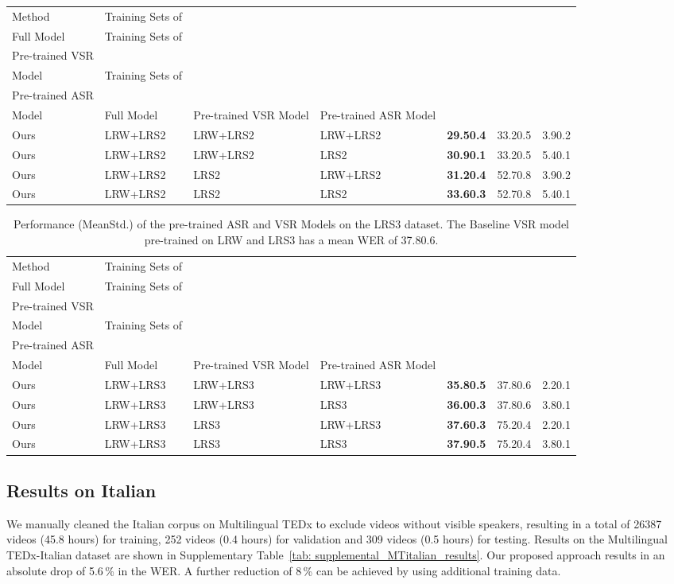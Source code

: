\documentclass[twocolumn]{article}
\begin{document}
\begin{table*}[!t]
\renewcommand\arraystretch{1.2}
\begin{tabularx}{2\columnwidth}{f j j j y y y }
\toprule
Method &Training Sets of \\Full Model &Training Sets of \\Pre-trained VSR\\ Model &Training Sets of \\ Pre-trained ASR \\Model & Full Model  &Pre-trained VSR Model &Pre-trained ASR Model \\
\midrule
Ours &LRW+LRS2 &LRW+LRS2 &LRW+LRS2  &\bf 29.50.4 &33.20.5 &3.90.2
\\ \midrule
Ours &LRW+LRS2 &LRW+LRS2 &LRS2 &\bf 30.90.1 &33.20.5 &5.40.1
\\ \midrule
Ours &LRW+LRS2 &LRS2 &LRW+LRS2 &\bf 31.20.4 &52.70.8
&3.90.2
\\ \midrule
Ours &LRW+LRS2 &LRS2 &LRS2 &\bf 33.60.3 &52.70.8
&5.40.1
\\ 
\bottomrule
\end{tabularx}
\label{table: r2_results_on_LRS2}
\end{table*}
 \begin{table*}[!t]
\caption{Performance (MeanStd.) of the pre-trained ASR and VSR Models on the LRS3 dataset. The Baseline VSR model pre-trained on LRW and LRS3 has a mean WER of 37.80.6.}
\renewcommand\arraystretch{1.2}
\begin{tabularx}{2\columnwidth}{f j j j y y y }
\toprule
Method &Training Sets of \\Full Model &Training Sets of \\Pre-trained VSR\\ Model &Training Sets of \\ Pre-trained ASR \\Model & Full Model  &Pre-trained VSR Model &Pre-trained ASR Model \\
\midrule
Ours &LRW+LRS3 &LRW+LRS3 &LRW+LRS3 &\bf 35.80.5 &37.80.6 &2.20.1
\\\midrule
Ours &LRW+LRS3 &LRW+LRS3 &LRS3 &\bf 36.00.3 &37.80.6 &3.80.1
\\ \midrule
Ours &LRW+LRS3 &LRS3 &LRW+LRS3 &\bf 37.60.3 &75.20.4
&2.20.1
\\ \midrule
Ours &LRW+LRS3 &LRS3 &LRS3 &\bf 37.90.5 &75.20.4
&3.80.1
\\
\bottomrule
\end{tabularx}
\label{table: r2_results_on_LRS3}
\end{table*} 
\subsection{Results on Italian}
We manually cleaned the Italian corpus on Multilingual TEDx to exclude videos without visible speakers, resulting in a total of 26387 videos (45.8 hours) for training, 252 videos (0.4 hours) for validation and 309 videos (0.5 hours) for testing. Results on the Multilingual TEDx-Italian dataset  are shown in Supplementary Table~\ref{tab: supplemental_MTitalian_results}. Our proposed approach results in an absolute drop of 5.6\,\%  in the WER. A further reduction of 8\,\% can be achieved by using additional training data.
\end{document}
